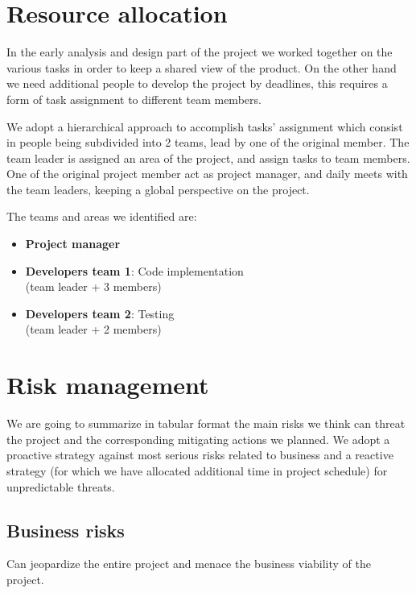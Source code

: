\documentclass[english]{article}
\begin{document}
\section{Resource allocation}
In  the early analysis and design part of the project we worked together on the various tasks in order to keep a shared view of the product. On the other hand we need additional people to develop the project by deadlines, this requires a form of task assignment to different team members.
\par We adopt a hierarchical approach to accomplish tasks' assignment which consist in people being subdivided into 2 teams, lead by one of the original member. The team leader is assigned an area of the project, and assign tasks to team members. One of the original project member act as project manager, and daily meets with the team leaders, keeping a global perspective on the project.
\par The teams and areas we identified are:
\begin{itemize}
	\item \textbf{Project manager}
	\item{ \textbf{Developers team 1}: Code implementation \\
	 (team leader + 3 members)}
	\item{\textbf{Developers team 2}: Testing\\
	 (team leader + 2 members)}
\end{itemize}
		
\section{Risk management}

	We are going to summarize in tabular format the main risks we think can threat the project and the corresponding mitigating actions we planned.
	We adopt a proactive strategy against most serious risks related to business and a reactive strategy (for which we have allocated additional time in project schedule) for unpredictable threats.
	
	\subsection{Business risks}
	Can jeopardize the entire project and menace the business viability of the project.
\end{document}
